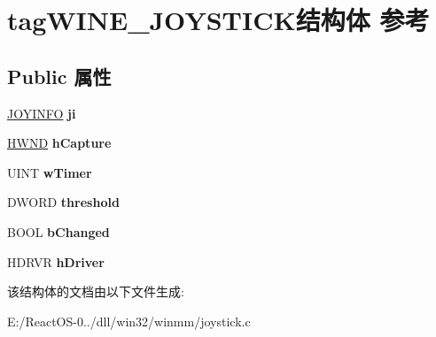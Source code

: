 \hypertarget{structtag_w_i_n_e___j_o_y_s_t_i_c_k}{}\section{tag\+W\+I\+N\+E\+\_\+\+J\+O\+Y\+S\+T\+I\+C\+K结构体 参考}
\label{structtag_w_i_n_e___j_o_y_s_t_i_c_k}
\subsection*{Public 属性}
\begin{DoxyCompactItemize}
\item 
\mbox{\label{structtag_w_i_n_e___j_o_y_s_t_i_c_k_adcb7e7bed95dc03e4af66c4a784a0c1a}} 
\hyperlink{structjoyinfo__tag}{J\+O\+Y\+I\+N\+FO} {\bfseries ji}
\item 
\mbox{\label{structtag_w_i_n_e___j_o_y_s_t_i_c_k_a3f328f108080d7387e9586983ff1f887}} 
\hyperlink{interfacevoid}{H\+W\+ND} {\bfseries h\+Capture}
\item 
\mbox{\label{structtag_w_i_n_e___j_o_y_s_t_i_c_k_afdc9cd0ad4fc6d735f5476908259fac8}} 
U\+I\+NT {\bfseries w\+Timer}
\item 
\mbox{\label{structtag_w_i_n_e___j_o_y_s_t_i_c_k_a7a869f92b4f7b54a4c73a374f43c8491}} 
D\+W\+O\+RD {\bfseries threshold}
\item 
\mbox{\label{structtag_w_i_n_e___j_o_y_s_t_i_c_k_acaf04c1d2e199b17984111b9e5bbee93}} 
B\+O\+OL {\bfseries b\+Changed}
\item 
\mbox{\label{structtag_w_i_n_e___j_o_y_s_t_i_c_k_a2293836ed9560423b00378d141b2ef0c}} 
H\+D\+R\+VR {\bfseries h\+Driver}
\end{DoxyCompactItemize}


该结构体的文档由以下文件生成\+:\begin{DoxyCompactItemize}
\item 
E\+:/\+React\+O\+S-\/0../dll/win32/winmm/joystick.\+c\end{DoxyCompactItemize}
